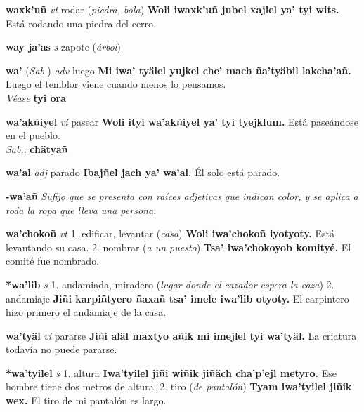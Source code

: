 \documentclass[10pt]{scrbook}
\newcommand{\entry}[1]{\textbf{#1}}
\newcommand{\onedefinition}[1]{#1.}
\newcommand{\nontranslationdef}[1]{\textit{#1}}
\newcommand{\partofspeech}[1]{\textit{#1}}
\newcommand{\spanishtranslation}[1]{#1}
\newcommand{\clarification}[1]{(\textit{#1})}
\newcommand{\cholexample}[1]{\textbf{#1}}
\newcommand{\exampletranslation}[1]{#1}
\newcommand{\dialectvariant}[1]{\\\textit{#1}:}
\newcommand{\dialectword}[1]{\textbf{#1}}
\newcommand{\alsosee}[1]{\\\textit{Véase} \textbf{#1}}
\newcommand{\relevantdialect}[1]{(\textit{#1})}
\begin{document}
\begin{multicols}{2}
\entry{waxk'uñ}
\partofspeech{vt}
\spanishtranslation{rodar}
\clarification{piedra, bola}
\cholexample{Woli iwaxk'uñ jubel xajlel ya' tyi wits.}
\exampletranslation{Está rodando una piedra del cerro.}

\entry{way ja'as}
\partofspeech{s}
\spanishtranslation{zapote}
\clarification{árbol}

\entry{wa'}
\relevantdialect{Sab.}
\partofspeech{adv}
\spanishtranslation{luego}
\cholexample{Mi iwa' tyälel yujkel che' mach ña'tyäbil lakcha'añ.}
\exampletranslation{Luego el temblor viene cuando menos lo pensamos.}
\alsosee{tyi ora}

\entry{wa'akñiyel}
\partofspeech{vi}
\spanishtranslation{pasear}
\cholexample{Woli ityi wa'akñiyel ya' tyi tyejklum.}
\exampletranslation{Está paseándose en el pueblo.}
\dialectvariant{Sab.}
\dialectword{chätyañ}

\entry{wa'al}
\partofspeech{adj}
\spanishtranslation{parado}
\cholexample{Ibajñel jach ya' wa'al.}
\exampletranslation{Él solo está parado.}

\entry{-wa'añ}
\nontranslationdef{Sufijo que se presenta con raíces adjetivas que indican color, y se aplica a toda la ropa que lleva una persona.}

\entry{wa'chokoñ}
\partofspeech{vt}
\onedefinition{1}
\spanishtranslation{edificar, levantar}
\clarification{casa}
\cholexample{Woli iwa'chokoñ iyotyoty.}
\exampletranslation{Está levantando su casa.}
\onedefinition{2}
\spanishtranslation{nombrar}
\clarification{a un puesto}
\cholexample{Tsa' iwa'chokoyob komityé.}
\exampletranslation{El comité fue nombrado.}

\entry{*wa'lib}
\partofspeech{s}
\onedefinition{1}
\spanishtranslation{andamiada, miradero}
\clarification{lugar donde el cazador espera la caza}
\onedefinition{2}
\spanishtranslation{andamiaje}
\cholexample{Jiñi karpiñtyero ñaxañ tsa' imele iwa'lib otyoty.}
\exampletranslation{El carpintero hizo primero el andamiaje de la casa.}

\entry{wa'tyäl}
\partofspeech{vi}
\spanishtranslation{pararse}
\cholexample{Jiñi aläl maxtyo añik mi imejlel tyi wa'tyäl.}
\exampletranslation{La criatura todavía no puede pararse.}

\entry{*wa'tyilel}
\partofspeech{s}
\onedefinition{1}
\spanishtranslation{altura}
\cholexample{Iwa'tyilel jiñi wiñik jiñäch cha'p'ejl metyro.}
\exampletranslation{Ese hombre tiene dos metros de altura.}
\onedefinition{2}
\spanishtranslation{tiro}
\clarification{de pantalón}
\cholexample{Tyam iwa'tyilel jiñik wex.}
\exampletranslation{El tiro de mi pantalón es largo.}


\end{multicols}
\end{document}
